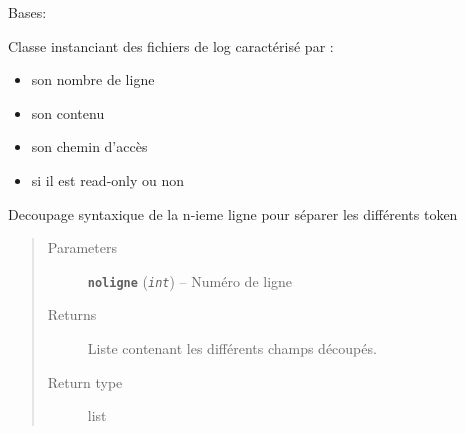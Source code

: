 \documentclass[letterpaper,10pt,english]{sphinxmanual}
\begin{document}
\begin{fulllineitems}
\label{loganalyser:loganalyser.fichier.FichierDeLog}
Bases: {\hyperref[loganalyser:loganalyser.fichier.Fichier]{\emph{}}}

Classe instanciant des fichiers de log caractérisé par :
\begin{itemize}
\item {} 
son nombre de ligne

\item {} 
son contenu

\item {} 
son chemin d'accès

\item {} 
si il est read-only ou non

\end{itemize}

\begin{fulllineitems}
\label{loganalyser:loganalyser.fichier.FichierDeLog.decouperligne}
Decoupage syntaxique de la n-ieme ligne pour séparer les différents token
\begin{quote}\begin{description}
\item[{Parameters}] \leavevmode
\textbf{\texttt{noligne}} (\emph{\texttt{int}}) -- Numéro de ligne

\item[{Returns}] \leavevmode
Liste contenant les différents champs découpés.

\item[{Return type}] \leavevmode
list

\end{description}\end{quote}

\end{fulllineitems}


\end{fulllineitems}

\end{document}
